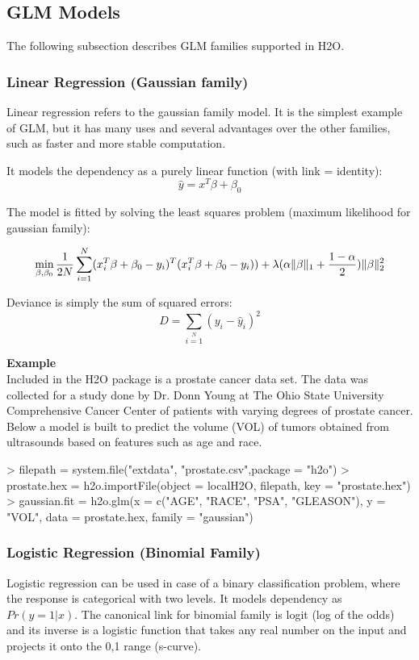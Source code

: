 \documentclass[11pt]{article}
\begin{document}
\subsection{GLM Models} 
The following subsection describes GLM families supported in H2O. 

\subsubsection{Linear Regression (Gaussian family) }
Linear regression refers to the gaussian family model. It is the simplest example of GLM, but it has many uses and several advantages over the other families, such as faster and more stable computation. 

It models the dependency as a purely linear function (with link = identity):
\[ \hat{y} = x^T\beta + \beta_0\]

The model is fitted by solving the least squares problem (maximum likelihood for gaussian family):

\[ \min\limits_{\beta,\beta_0} { {1 \over 2N}\sum\limits_{i=1}\limits^{N}(x_i^{T}\beta  + \beta_0- y_i)^T (x_i^{T}\beta + \beta_0 - y_i))  + \lambda (\alpha \|\beta \|_1 + {1-\alpha \over 2}) \| \beta \|_2^2} \]


Deviance is simply the sum of squared errors:
\[ D = \sum\limits_{i=1}\limits^{N}{(y_i - \hat{y}_i)^2} \]


\textbf{Example}\\
Included in the H2O package is a prostate cancer data set. The data was collected for a study done by Dr. Donn Young at The Ohio State University Comprehensive Cancer Center of patients with varying degrees of prostate cancer. Below a model is built to predict the volume (VOL) of tumors obtained from ultrasounds based on features such as age and race.

\begin{spverbatim}
> filepath = system.file("extdata", "prostate.csv",package = "h2o")
> prostate.hex = h2o.importFile(object = localH2O, filepath, key = "prostate.hex")
> gaussian.fit = h2o.glm(x = c("AGE", "RACE", "PSA", "GLEASON"), y = "VOL", data = prostate.hex, family = "gaussian")
\end{spverbatim}

\subsubsection{Logistic Regression (Binomial Family)}
Logistic regression can be used in case of a binary classification problem, where the response is categorical with two levels. It models dependency as $Pr(y = 1|x)$. The canonical link for binomial family is logit (log of the odds) and its inverse is a logistic function that takes any real number on the input and projects it onto the 0,1 range (s-curve). 
\end{document}
